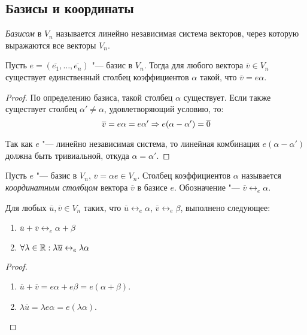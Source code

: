 \subsection{Базисы и координаты}

\begin{definition}
	\textit{Базисом} в $V_n$ называется линейно независимая система векторов, через которую выражаются все векторы $V_n$.
\end{definition}

\begin{proposition}
	Пусть $e = (\overline{e_1}, \dots, \overline{e_n})$ "--- базис в $V_n$. Тогда для любого вектора $\overline v \in V_n$ существует единственный столбец коэффициентов $\alpha$ такой, что $\overline{v} = e\alpha$.
\end{proposition}

\begin{proof}
	По определению базиса, такой столбец $\alpha$ существует. Если также существует столбец $\alpha' \ne \alpha$, удовлетворяющий условию, то:
	\[\overline{v} = e\alpha = e\alpha' \Rightarrow
	e(\alpha - \alpha') = \overline{0}\]
	
	Так как $e$ "--- линейно независимая система, то линейная комбинация $e(\alpha - \alpha')$ должна быть тривиальной, откуда $\alpha = \alpha'$.
\end{proof}

\begin{definition}
	Пусть $e$ "--- базис в $V_n$, $\overline{v} = \alpha e \in V_n$. Столбец коэффициентов $\alpha$ называется \textit{координатным столбцом} вектора $\overline{v}$ в базисе $e$. Обозначение "--- $\overline{v} \leftrightarrow_e \alpha$.
\end{definition}

\begin{proposition}
	Для любых $\overline u, \overline v \in V_n$ таких, что $\overline u \leftrightarrow_e \alpha$, $\overline v \leftrightarrow_e \beta$, выполнено следующее:
	\begin{enumerate}
		\item $\overline u + \overline v \leftrightarrow_e \alpha + \beta$
		\item $\forall \lambda \in \mathbb{R}: \lambda \overline u \leftrightarrow_e \lambda\alpha$
	\end{enumerate}
\end{proposition}

\begin{proof}~
	\begin{enumerate}
		\item $\overline{u} + \overline{v} = e\alpha + e\beta = e(\alpha + \beta)$.
		\item $\lambda\overline{u} = \lambda e\alpha = e(\lambda \alpha)$.\qedhere
	\end{enumerate}
\end{proof}

